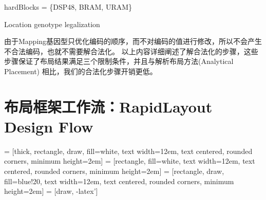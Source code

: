 \begin{algorithm}
	
	
	hardBlocks = \{DSP48, BRAM, URAM\}\;
	
	\caption{Location genotype legalization}	
	\label{algo:location}
\end{algorithm}

由于Mapping基因型只优化编码的顺序，而不对编码的值进行修改，所以不会产生不合法编码，也就不需要解合法化。
以上内容详细阐述了解合法化的步骤，这些步骤保证了布局结果满足三个限制条件，并且与解析布局方法(Analytical Placement)
相比，我们的合法化步骤开销更低。



\section{布局框架工作流：RapidLayout Design Flow}



 = [thick, rectangle, draw, fill=white, text width=12em, text centered, rounded corners, minimum height=2em]
 = [rectangle, fill=white, text width=12em, text centered, rounded corners, minimum height=2em]
 = [rectangle, draw, fill=blue!20, text width=12em, text centered, rounded corners, minimum height=2em]
 = [draw, -latex']




